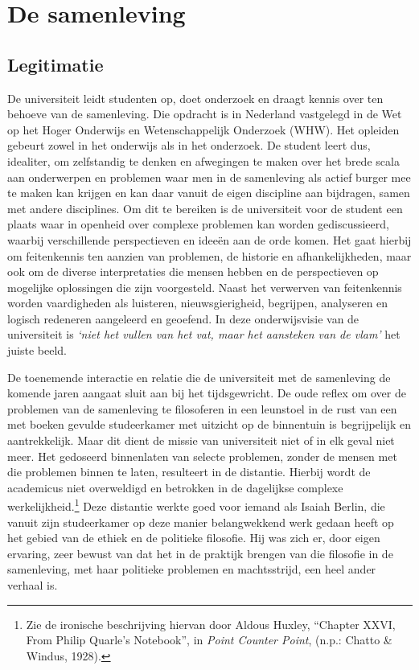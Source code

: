 \documentclass[smallauthor, chapterhaspagenum, nochapterinheader, pagenuminheader,  bigchapnum,medium2, tocpages,  garamond, titleinheader]{jote-book}
\begin{document}
	\chapter{De samenleving }



	\section{Legitimatie }



	De universiteit leidt studenten op, doet onderzoek en draagt kennis over ten behoeve van de samenleving. Die opdracht is in Nederland vastgelegd in de Wet op het Hoger Onderwijs en Wetenschappelijk Onderzoek (WHW). Het opleiden gebeurt zowel in het onderwijs als in het onderzoek. De student leert dus, idealiter, om zelfstandig te denken en afwegingen te maken over het brede scala aan onderwerpen en problemen waar men in de samenleving als actief burger mee te maken kan krijgen en kan daar vanuit de eigen discipline aan bijdragen, samen met andere disciplines. Om dit te bereiken is de universiteit voor de student een plaats waar in openheid over complexe problemen kan worden gediscussieerd, waarbij verschillende perspectieven en ideeën aan de orde komen. Het gaat hierbij om feitenkennis ten aanzien van problemen, de historie en afhankelijkheden, maar ook om de diverse interpretaties die mensen hebben en de perspectieven op mogelijke oplossingen die zijn voorgesteld. Naast het verwerven van feitenkennis worden vaardigheden als luisteren, nieuwsgierigheid, begrijpen, analyseren en logisch redeneren aangeleerd en geoefend. In deze onderwijsvisie van de universiteit is \emph{‘niet het vullen van het vat, maar het aansteken van de vlam'} het juiste beeld.



	De toenemende interactie en relatie die de universiteit met de samenleving de komende jaren aangaat sluit aan bij het tijdsgewricht. De oude reflex om over de problemen van de samenleving te filosoferen in een leunstoel in de rust van een met boeken gevulde studeerkamer met uitzicht op de binnentuin is begrijpelijk en aantrekkelijk. Maar dit dient de missie van universiteit niet of in elk geval niet meer. Het gedoseerd binnenlaten van selecte problemen, zonder de mensen met die problemen binnen te laten, resulteert in de distantie. Hierbij wordt de academicus niet overweldigd en betrokken in de dagelijkse complexe werkelijkheid.\footnote{Zie de ironische beschrijving hiervan door Aldous Huxley, “Chapter XXVI, From Philip Quarle's Notebook”, in \emph{Point Counter Point}, (n.p.: Chatto \& Windus, 1928).} Deze distantie werkte goed voor iemand als Isaiah Berlin, die vanuit zijn studeerkamer op deze manier belangwekkend werk gedaan heeft op het gebied van de ethiek en de politieke filosofie. Hij was zich er, door eigen ervaring, zeer bewust van dat het in de praktijk brengen van die filosofie in de samenleving, met haar politieke problemen en machtsstrijd, een heel ander verhaal is.
\end{document}
